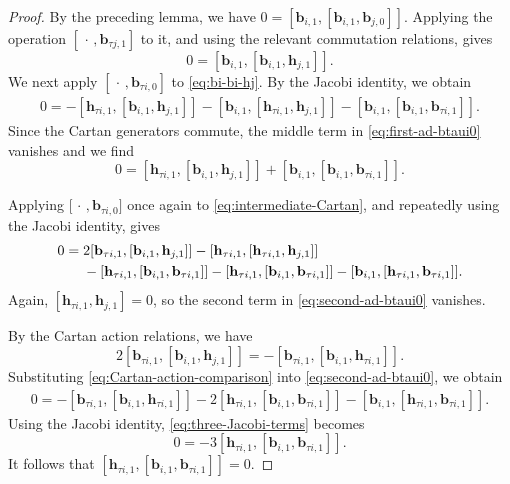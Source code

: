 \documentclass[11pt,reqno]{amsart}
\numberwithin{equation}{section}
\theoremstyle{definition}
\theoremstyle{remark}
\begin{document}
\begin{proof}
By the preceding lemma, we have
$0=
 [\mathbf b_{i,1},
  [\mathbf b_{i,1},\mathbf b_{j,0}]]$.
Applying the operation
\([\,\cdot\,,\mathbf b_{\tau j,1}]\)
to it, and using the relevant commutation
relations, gives
\begin{equation}
 0=
 [\mathbf b_{i,1},
  [\mathbf b_{i,1},\mathbf h_{j,1}]].
 \label{eq:bi-bi-hj}
\end{equation}
We next apply
\( [\,\cdot\,,\mathbf b_{\tau i,0} ]\)
to \eqref{eq:bi-bi-hj}. By the Jacobi identity, we obtain
\begin{align}
 0
 =
 -[\mathbf h_{\tau i,1},
   [\mathbf b_{i,1},\mathbf h_{j,1}]]
 -
 [\mathbf b_{i,1},
   [\mathbf h_{\tau i,1},\mathbf h_{j,1}]]
 -
 [\mathbf b_{i,1},
   [\mathbf b_{i,1},\mathbf b_{\tau i,1}]].
 \label{eq:first-ad-btaui0}
\end{align}
Since the Cartan generators commute, the middle term in
\eqref{eq:first-ad-btaui0} vanishes and we find
\begin{equation}
 0=
 [\mathbf h_{\tau i,1},
  [\mathbf b_{i,1},\mathbf h_{j,1}]]
 +
 [\mathbf b_{i,1},
  [\mathbf b_{i,1},\mathbf b_{\tau i,1}]].
 \label{eq:intermediate-Cartan}
\end{equation}

Applying
\(\bigl[\,\cdot\,,\mathbf b_{\tau i,0}\bigr]\)
once again to \eqref{eq:intermediate-Cartan}, and repeatedly using the
Jacobi identity, gives
\begin{align}
 0
 ={}&
 2[\mathbf b_{\tau i,1},
   [\mathbf b_{i,1},\mathbf h_{j,1}]]
 -
 [\mathbf h_{\tau i,1},
   [\mathbf h_{\tau i,1},\mathbf h_{j,1}]]
 \notag\\
 & 
 -
 [\mathbf h_{\tau i,1},
   [\mathbf b_{i,1},\mathbf b_{\tau i,1}]]
 -
 [\mathbf h_{\tau i,1},
   [\mathbf b_{i,1},\mathbf b_{\tau i,1}]]
 -
 [\mathbf b_{i,1},
   [\mathbf h_{\tau i,1},\mathbf b_{\tau i,1}]].
 \label{eq:second-ad-btaui0}
\end{align}
Again,
\(
 [\mathbf h_{\tau i,1},\mathbf h_{j,1}]=0
\),
so the second term in \eqref{eq:second-ad-btaui0} vanishes.

By the Cartan action relations, we have
\begin{equation}
 2[\mathbf b_{\tau i,1},
   [\mathbf b_{i,1},\mathbf h_{j,1}]]
 =
 -[\mathbf b_{\tau i,1},
   [\mathbf b_{i,1},\mathbf h_{\tau i,1}]].
 \label{eq:Cartan-action-comparison}
\end{equation}
Substituting \eqref{eq:Cartan-action-comparison} into
\eqref{eq:second-ad-btaui0}, we obtain
\begin{align}
 0
 =
 -[\mathbf b_{\tau i,1},
   [\mathbf b_{i,1},\mathbf h_{\tau i,1}]]
 -
 2[\mathbf h_{\tau i,1},
   [\mathbf b_{i,1},\mathbf b_{\tau i,1}]]
 -
 [\mathbf b_{i,1},
   [\mathbf h_{\tau i,1},\mathbf b_{\tau i,1}]].
 \label{eq:three-Jacobi-terms}
\end{align}
Using the Jacobi identity, \eqref{eq:three-Jacobi-terms} becomes
\begin{equation*}
 0=
 -3[\mathbf h_{\tau i,1},
    [\mathbf b_{i,1},\mathbf b_{\tau i,1}]].
\end{equation*}
It follows that $[\mathbf h_{\tau i,1},
  [\mathbf b_{i,1},\mathbf b_{\tau i,1}]]
 =0$.


\end{proof}
\end{document}
